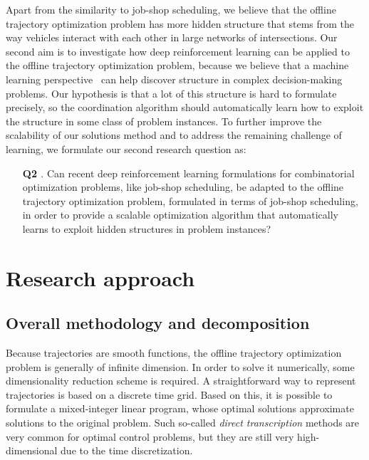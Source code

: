 \documentclass{article}
\makeatletter
\def\namedlabel#1#2{\begingroup
    #2%
    \def\@currentlabel{#2}%
    \phantomsection\label{#1}\endgroup
}
\theoremstyle{definition}
\theoremstyle{plain}
\makeatother
\begin{document}
Apart from the similarity to job-shop scheduling, we believe that the offline
trajectory optimization problem has more hidden structure that stems from the
way vehicles interact with each other in large networks of intersections. Our
second aim is to investigate how deep reinforcement learning can be applied to
the offline trajectory optimization problem, because we believe that a machine
learning perspective~\cite{bengioMachineLearningCombinatorial2020} can help discover structure in complex decision-making
problems. Our hypothesis is that a lot of this structure is hard to formulate
precisely, so the coordination algorithm should automatically learn how to
exploit the structure in some class of problem instances. To further improve the
scalability of our solutions method and to address the remaining challenge of
learning, we formulate our second research question as:
%
\begin{enumerate}
  \item[\textbf{\namedlabel{Q2}{Q2}}.] Can recent deep reinforcement learning formulations for
        combinatorial optimization problems, like job-shop scheduling, be
        adapted to the offline trajectory optimization problem, formulated in
        terms of job-shop scheduling, in order to provide a scalable
        optimization algorithm that automatically learns to exploit hidden
        structures in problem instances?
\end{enumerate}


\newpage

\section{Research approach}

\subsection{Overall methodology and decomposition}

Because trajectories are smooth functions, the offline trajectory optimization
problem is generally of infinite dimension. In order to solve it numerically,
some dimensionality reduction scheme is required. A straightforward way to
represent trajectories is based on a discrete time grid. Based on this, it is
possible to formulate a mixed-integer linear program, whose optimal solutions
approximate solutions to the original problem. Such so-called \textit{direct
  transcription} methods are very common for optimal control problems, but they
are still very high-dimensional due to the time discretization.
\end{document}
